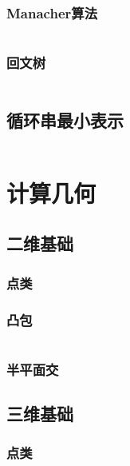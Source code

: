 \documentclass[a4paper]{article}
\newcommand{\cppcode}[1]{
    \inputminted[mathescape]{cpp}{source/#1}
}
\begin{document}
\subsubsection{Manacher算法}

\cppcode{string-manipulation/manacher.cpp}

\subsubsection{回文树}

\cppcode{string-manipulation/palindrome-tree.cpp}

\subsection{循环串最小表示}

\cppcode{string-manipulation/minimum-circular-representation.cpp}

\section{计算几何}

\subsection{二维基础}

\subsubsection{点类}

\subsubsection{凸包}

\cppcode{computational-geometry/convex-hull.cpp}

\subsubsection{半平面交}

\subsection{三维基础}

\subsubsection{点类}
\end{document}
